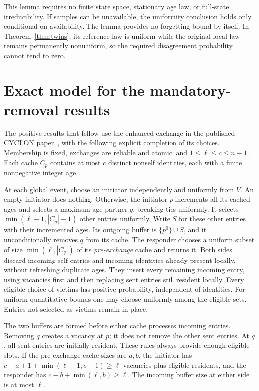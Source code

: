 \documentclass[11pt]{article}
\begin{document}
This lemma requires no finite state space, stationary age law,
or full-state irreducibility. If samples can be unavailable, the
uniformity conclusion holds only conditional on availability.
The lemma provides no forgetting bound by itself. In
Theorem~\ref{thm:twins}, its reference law is uniform while the original
local law remains permanently nonuniform, so the required disagreement
probability cannot tend to zero.

\section{Exact model for the mandatory-removal results}
\label{sec:mandatorymodel}

The positive results that follow use the enhanced exchange in the
published CYCLON paper~\cite[Section 2.2]{cyclon}, with the following
explicit completion of its choices. Membership is fixed, exchanges
are reliable and atomic, and $1\le\ell\le c\le n-1$. Each cache
$C_p$ contains at most $c$ distinct nonself identities, each with a
finite nonnegative integer age.

At each global event, choose an initiator independently and uniformly
from $V$. An empty initiator does nothing. Otherwise, the initiator
$p$ increments all its cached ages and selects a maximum-age partner
$q$, breaking ties uniformly. It selects
$\min(\ell-1,|C_p|-1)$ other entries uniformly. Write $S$ for these
other entries with their incremented ages. Its outgoing buffer is
$\{p^0\}\cup S$, and it unconditionally removes $q$ from its cache.
The responder chooses a uniform subset of size
$\min(\ell,|C_q|)$ of its \emph{pre-exchange} cache and returns it.
Both sides discard incoming self entries and incoming identities
already present locally, without refreshing duplicate ages. They
insert every remaining incoming entry, using vacancies first and
then replacing sent entries still resident locally. Every eligible
choice of victims has positive probability, independent of identities.
For uniform quantitative bounds one may choose uniformly among the
eligible sets. Entries not selected as victims remain in place.

The two buffers are formed before either cache processes incoming
entries. Removing $q$ creates a vacancy at $p$; it does not remove
the other sent entries. At $q$, all sent entries are initially
resident. These rules always provide enough eligible slots. If the
pre-exchange cache sizes are $a,b$, the initiator has
$c-a+1+\min(\ell-1,a-1)\ge\ell$ vacancies plus eligible residents,
and the responder has $c-b+\min(\ell,b)\ge\ell$.
The incoming buffer size at either side is at most $\ell$.
\end{document}

